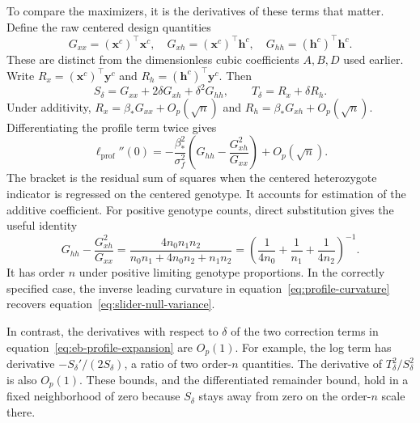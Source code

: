 \documentclass[11pt]{article}
\begin{document}
To compare the maximizers, it is the derivatives of these terms
that matter. Define the raw centered design quantities
\begin{equation}
G_{xx}=(\mathbf x^c)^\top\mathbf x^c,\quad
G_{xh}=(\mathbf x^c)^\top\mathbf h^c,\quad
G_{hh}=(\mathbf h^c)^\top\mathbf h^c.
\end{equation}
These are distinct from the dimensionless cubic coefficients
$A,B,D$ used earlier. Write
$R_x=(\mathbf x^c)^\top\mathbf y^c$ and
$R_h=(\mathbf h^c)^\top\mathbf y^c$. Then
\begin{equation}
S_\delta=G_{xx}+2\delta G_{xh}+\delta^2G_{hh},\qquad
T_\delta=R_x+\delta R_h.
\end{equation}
Under additivity,
$R_x=\beta_*G_{xx}+O_p(\sqrt n)$ and
$R_h=\beta_*G_{xh}+O_p(\sqrt n)$. Differentiating the profile
term twice gives
\begin{equation}
\ell_{\mathrm{prof}}''(0)
=-\frac{\beta_*^2}{\sigma_f^2}
  \left(G_{hh}-\frac{G_{xh}^2}{G_{xx}}\right)
 +O_p(\sqrt n).
\label{eq:profile-curvature}
\end{equation}
The bracket is the residual sum of squares when the centered
heterozygote indicator is regressed on the centered genotype.
It accounts for estimation of the additive coefficient. For
positive genotype counts, direct substitution gives the useful identity
\begin{equation}
G_{hh}-\frac{G_{xh}^2}{G_{xx}}
=\frac{4n_0n_1n_2}{n_0n_1+4n_0n_2+n_1n_2}
=\left(\frac1{4n_0}+\frac1{n_1}+\frac1{4n_2}\right)^{-1}.
\label{eq:residualized-heterozygote-information}
\end{equation}
It has order $n$ under positive limiting genotype proportions.
In the correctly specified case, the inverse leading curvature
in equation~\eqref{eq:profile-curvature} recovers
equation~\eqref{eq:slider-null-variance}.

In contrast, the derivatives with respect to $\delta$ of the two
correction terms in equation~\eqref{eq:eb-profile-expansion} are
$O_p(1)$. For example, the log term has derivative
$-S_\delta'/(2S_\delta)$, a ratio of two order-$n$ quantities.
The derivative of $T_\delta^2/S_\delta^2$ is also $O_p(1)$.
These bounds, and the differentiated remainder bound, hold in a
fixed neighborhood of zero because $S_\delta$ stays away from zero
on the order-$n$ scale there.
\end{document}
